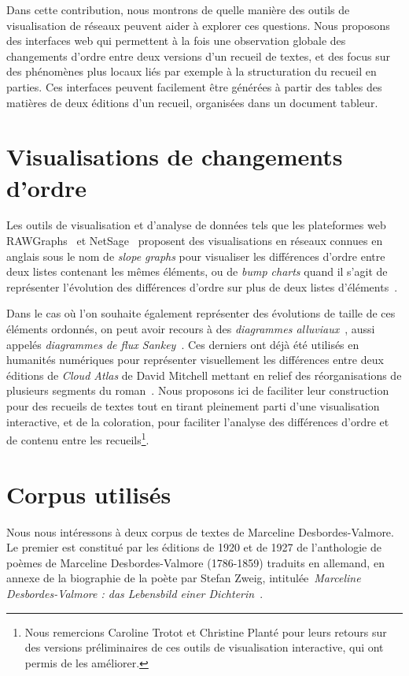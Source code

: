 \documentclass[final, fra]{anthology-ch}     %
\begin{document}
Dans cette contribution, nous montrons de quelle manière des outils de visualisation de réseaux peuvent aider à explorer ces questions. Nous proposons des interfaces web qui permettent à la fois une observation globale des changements d'ordre entre deux versions d'un recueil de textes, et des focus sur des phénomènes plus locaux liés par exemple à la structuration du recueil en parties. Ces interfaces peuvent facilement être générées à partir des tables des matières de deux éditions d'un recueil, organisées dans un document tableur.

\section{Visualisations de changements d'ordre}\label{sec:litterature}

Les outils de visualisation et d'analyse de données tels que les plateformes web RAWGraphs~\cite{Mauri2017} et NetSage~\cite{Schopf2022} proposent des visualisations en réseaux connues en anglais sous le nom de \emph{slope graphs} pour visualiser les différences d'ordre entre deux listes contenant les mêmes éléments, ou de \emph{bump charts} quand il s'agit de représenter l'évolution des différences d'ordre sur plus de deux listes d'éléments~\cite{Tufte2011}.

Dans le cas où l'on souhaite également représenter des évolutions de taille de ces éléments ordonnés, on peut avoir recours à des \emph{diagrammes alluviaux}~\cite{Mauri2017}, aussi appelés \emph{diagrammes de flux Sankey}~\cite{Schopf2022}. Ces derniers ont déjà été utilisés en humanités numériques pour représenter visuellement les différences entre deux éditions de \emph{Cloud Atlas} de David Mitchell mettant en relief des réorganisations de plusieurs segments du roman~\cite{Eve2016}. Nous proposons ici de faciliter leur construction pour des recueils de textes tout en tirant pleinement parti d'une visualisation interactive, et de la coloration, pour faciliter l'analyse des différences d'ordre et de contenu entre les recueils\footnote{Nous remercions Caroline Trotot et Christine Planté pour leurs retours sur des versions préliminaires de ces outils de visualisation interactive, qui ont permis de les améliorer.}.

\section{Corpus utilisés}\label{sec:corpus}

Nous nous intéressons à deux corpus de textes de Marceline Desbordes-Valmore. Le premier est constitué par les éditions de 1920 et de 1927 de l'anthologie de poèmes de Marceline Desbordes-Valmore (1786-1859) traduits en allemand, en annexe de la biographie de la poète par Stefan Zweig, intitulée~\emph{Marceline Desbordes-Valmore : das Lebensbild einer Dichterin}~\cite{Zweig1920App,Zweig1927App}.
\end{document}
